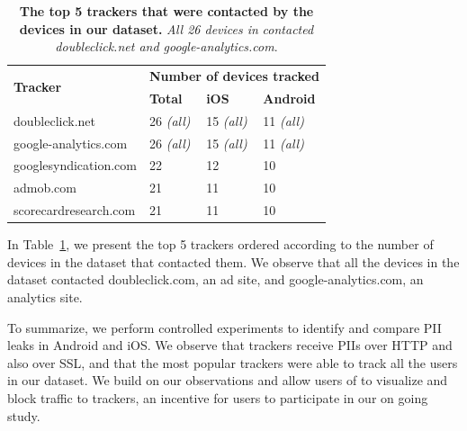 \begin{table}
\centering
\begin{small}
\begin{tabular}{|p{}|p{}|p{}|p{}|}
\hline
\multirow{2}{*}{\bf Tracker} & \multicolumn{3}{c|}{\bf Number of devices tracked}\tabularnewline
\cline{2-4}
                      &  {\bf Total} & {\bf iOS} & {\bf Android} \tabularnewline
\hline
doubleclick.net       & 26 {\em(all)} & 15 {\em(all)} & 11 {\em(all)} \tabularnewline
\hline
google-analytics.com  & 26 {\em(all)} & 15 {\em(all)}  & 11 {\em(all)} \tabularnewline
\hline
googlesyndication.com & 22 & 12 & 10 \tabularnewline
\hline
admob.com             & 21 & 11 & 10 \tabularnewline
\hline
scorecardresearch.com &  21 & 11 & 10 \tabularnewline
\hline
\end{tabular}
\end{small}
\caption{\textbf{The top 5 trackers that were contacted by the devices in our dataset.}
\emph{All 26 devices in} \mobWild \emph{contacted doubleclick.net and google-analytics.com}.}
\vspace{\postfigspace}
\label{tab:top-trackers}
\end{table}

In Table~\ref{tab:top-trackers}, we present the top 5 trackers ordered according to the number of devices in the \mobWild dataset that contacted them.
We observe that all the devices in the \mobWild dataset contacted doubleclick.com, an ad site, and google-analytics.com, an analytics site. 

To summarize, we perform controlled experiments to identify and compare PII leaks in Android and iOS. 
We observe that trackers receive PIIs over HTTP and also over SSL, and that the most popular trackers were able to track all the users in our \mobWild dataset.
We build on our observations and allow users of \meddle to visualize and block traffic to trackers, an incentive for users to participate in our on going study. 


